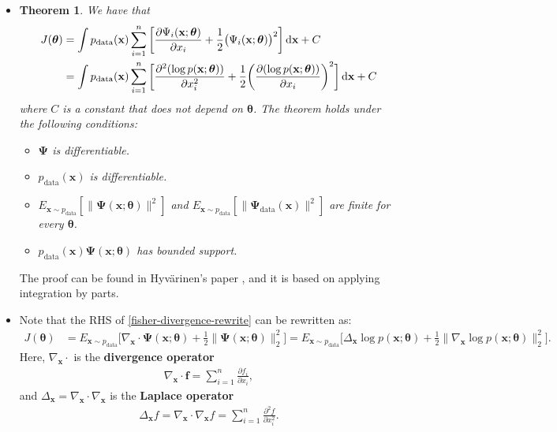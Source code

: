 \documentclass[10pt]{article}
\newtheorem{theorem}[lemma]{Theorem}
\newcommand{\dee}{\mathrm{d}}
\newcommand{\ve}[1]{\mathbf{#1}}
\newcommand{\mrm}[1]{\mathrm{#1}}
\newcommand{\ves}[1]{\boldsymbol{#1}}
\begin{document}
\begin{itemize}
  \item \begin{theorem} \label{thm:score-matching}
  We have that
  \begin{align}
      J(\ves{\theta}) 
      &= \int p_{\mrm{data}}(\ve{x}) \sum_{i=1}^n \bigg[ \frac{\partial \Psi_i(\ve{x};\boldsymbol{\theta})}{\partial x_i} + \frac{1}{2} \big( \Psi_i(\ve{x};\boldsymbol{\theta}) \big)^2 \bigg]\, \dee\ve{x} + C \notag\\
      &= \int p_{\mrm{data}}(\ve{x}) \sum_{i=1}^n \bigg[ 
      \frac{\partial^2 (\log p(\ve{x};\boldsymbol{\theta}))}{\partial x_i^2}
      + \frac{1}{2} \bigg( \frac{\partial(\log p(\ve{x};\boldsymbol{\theta}))}{\partial x_i} \bigg)^2
      \bigg]\, \dee\ve{x} + C \label{fisher-divergence-rewrite}
  \end{align}
  where $C$ is a constant that does not depend on $\boldsymbol{\theta}$. The theorem holds under the following conditions:
  \begin{itemize}
    \item $\boldsymbol{\Psi}$ is differentiable.
    \item $p_{\mrm{data}}(\ve{x})$ is differentiable.
    \item $E_{\ve{x} \sim p_{\mrm{data}}}[\| \boldsymbol{\Psi}(\ve{x};\boldsymbol{\theta}) \|^2]$ and $E_{\ve{x} \sim p_{\mrm{data}}}[\| \boldsymbol{\Psi}_{\mrm{data}}(\ve{x}) \|^2]$ are finite for every $\boldsymbol{\theta}$.
    \item $p_{\mrm{data}}(\ve{x})\boldsymbol{\Psi}(\ve{x};\boldsymbol{\theta})$ has bounded support.
  \end{itemize}  
  \end{theorem}
  The proof can be found in Hyv\"{a}rinen's paper \cite{Hyvarinen:2005}, and it is based on applying integration by parts.

  \item Note that the RHS of \eqref{fisher-divergence-rewrite} can be rewritten as:
  \begin{align*}
      J(\ves{\theta}) 
      &= E_{\ve{x} \sim p_{\mrm{data}}} \bigg[ \nabla_{\ve{x}} \cdot \ves{\Psi}(\ve{x};\ves{\theta}) + \frac{1}{2} \| \ves{\Psi}(\ve{x};\ves{\theta}) \|_2^2 \bigg]
      = E_{\ve{x} \sim p_{\mrm{data}}} \bigg[ \Delta_\ve{x} \log p(\ve{x};\ves{\theta}) + \frac{1}{2} \| \nabla_{\ve{x}} \log p(\ve{x};\ves{\theta}) \|_2^2 \bigg].
  \end{align*}
  Here, $\nabla_{\ve{x}} \cdot$ is the {\bf divergence operator}
  \begin{align*}
      \nabla_{\ve{x}} \cdot \ve{f} = \sum_{i=1}^n \frac{\partial f_i}{\partial x_i},
  \end{align*}
  and $\Delta_{\ve{x}} = \nabla_{\ve{x}} \cdot \nabla_{\ve{x}}$ is the {\bf Laplace operator}
  \begin{align*}
      \Delta_{\ve{x}} f = \nabla_{\ve{x}} \cdot \nabla_{\ve{x}} f = \sum_{i=1}^n \frac{\partial^2 f}{\partial x_i^2}.
  \end{align*}


\end{itemize}
\end{document}
